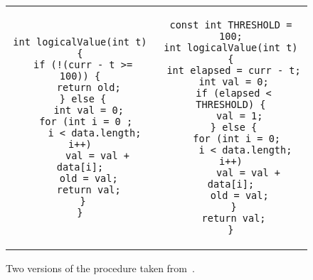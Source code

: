 \begin{figure}
\centering
\begin{tabular}{cc}
\begin{lstlisting}
int logicalValue(int t) {
 if (!(curr - t >= 100)) {
   return old;
 } else {
   int val = 0;
   for (int i = 0 ; 
     i < data.length; i++)
      val = val + data[i];
   old = val;
   return val;
 }
}
\end{lstlisting}
&
\begin{lstlisting}
const int THRESHOLD = 100;
int logicalValue(int t) {
 int elapsed = curr - t;
 int val = 0;
 if (elapsed < THRESHOLD) {
   val = 1;
 } else {
   for (int i = 0; 
     i < data.length; i++)
      val = val + data[i];
   old = val;
 }
 return val;
}
\end{lstlisting}
\end{tabular}
\caption{Two versions of the  procedure taken from~\cite{DwyerElbaumPerson08}.}
\end{figure} 